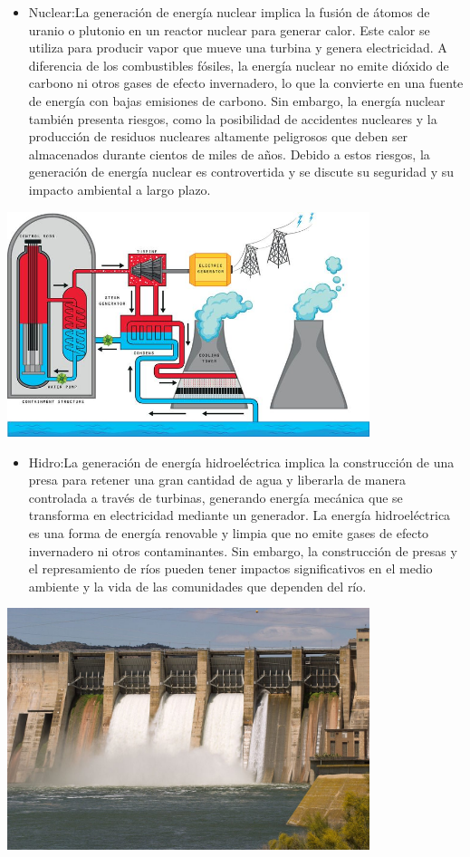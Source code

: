 \documentclass[
]{article}
\providecommand{\tightlist}{%
  \setlength{\itemsep}{0pt}\setlength{\parskip}{0pt}}
\begin{document}
\begin{itemize}
\tightlist
\item
  Nuclear:La generación de energía nuclear implica la fusión de átomos
  de uranio o plutonio en un reactor nuclear para generar calor. Este
  calor se utiliza para producir vapor que mueve una turbina y genera
  electricidad. A diferencia de los combustibles fósiles, la energía
  nuclear no emite dióxido de carbono ni otros gases de efecto
  invernadero, lo que la convierte en una fuente de energía con bajas
  emisiones de carbono. Sin embargo, la energía nuclear también presenta
  riesgos, como la posibilidad de accidentes nucleares y la producción
  de residuos nucleares altamente peligrosos que deben ser almacenados
  durante cientos de miles de años. Debido a estos riesgos, la
  generación de energía nuclear es controvertida y se discute su
  seguridad y su impacto ambiental a largo plazo.
\end{itemize}

\includegraphics[width=4.16667in,height=\textheight]{nucle.jpeg}

\begin{itemize}
\tightlist
\item
  Hidro:La generación de energía hidroeléctrica implica la construcción
  de una presa para retener una gran cantidad de agua y liberarla de
  manera controlada a través de turbinas, generando energía mecánica que
  se transforma en electricidad mediante un generador. La energía
  hidroeléctrica es una forma de energía renovable y limpia que no emite
  gases de efecto invernadero ni otros contaminantes. Sin embargo, la
  construcción de presas y el represamiento de ríos pueden tener
  impactos significativos en el medio ambiente y la vida de las
  comunidades que dependen del río.
\end{itemize}

\includegraphics[width=4.16667in,height=\textheight]{hidro.jpeg}
\end{document}
